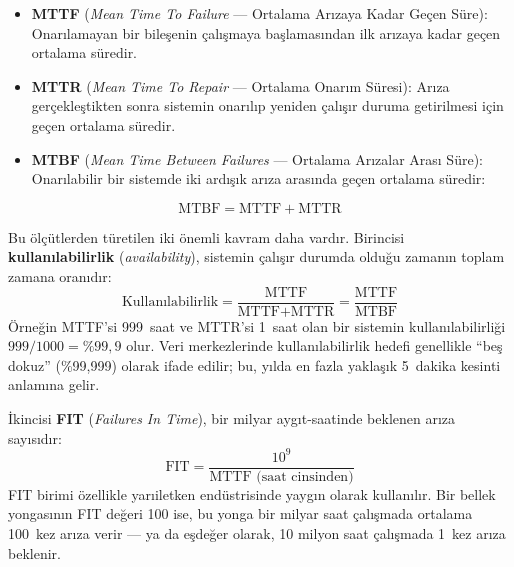 \begin{itemize}
    \item \textbf{MTTF} (\emph{Mean Time To Failure} --- Ortalama Arızaya Kadar Geçen Süre): Onarılamayan bir bileşenin çalışmaya başlamasından ilk arızaya kadar geçen ortalama süredir.

    \item \textbf{MTTR} (\emph{Mean Time To Repair} --- Ortalama Onarım Süresi): Arıza gerçekleştikten sonra sistemin onarılıp yeniden çalışır duruma getirilmesi için geçen ortalama süredir.

    \item \textbf{MTBF} (\emph{Mean Time Between Failures} --- Ortalama Arızalar Arası Süre): Onarılabilir bir sistemde iki ardışık arıza arasında geçen ortalama süredir:
\end{itemize}
%
\begin{equation}
\text{MTBF} = \text{MTTF} + \text{MTTR}
\label{eq:mtbf}
\end{equation}

Bu ölçütlerden türetilen iki önemli kavram daha vardır. Birincisi \textbf{kullanılabilirlik} (\emph{availability}), sistemin çalışır durumda olduğu zamanın toplam zamana oranıdır:
%
\begin{equation}
\text{Kullanılabilirlik} = \frac{\text{MTTF}}{\text{MTTF} + \text{MTTR}} = \frac{\text{MTTF}}{\text{MTBF}}
\label{eq:kullanilabilirlik}
\end{equation}
%
Örneğin MTTF'si 999~saat ve MTTR'si 1~saat olan bir sistemin kullanılabilirliği $999/1000 = \%99{,}9$ olur. Veri merkezlerinde kullanılabilirlik hedefi genellikle ``beş dokuz'' (\%99,999) olarak ifade edilir; bu, yılda en fazla yaklaşık 5~dakika kesinti anlamına gelir.

İkincisi \textbf{FIT} (\emph{Failures In Time}), bir milyar aygıt-saatinde beklenen arıza sayısıdır:
%
\begin{equation}
\text{FIT} = \frac{10^9}{\text{MTTF (saat cinsinden)}}
\label{eq:fit}
\end{equation}
%
FIT birimi özellikle yarıiletken endüstrisinde yaygın olarak kullanılır. Bir bellek yongasının FIT değeri 100 ise, bu yonga bir milyar saat çalışmada ortalama 100~kez arıza verir --- ya da eşdeğer olarak, 10 milyon saat çalışmada 1~kez arıza beklenir.

